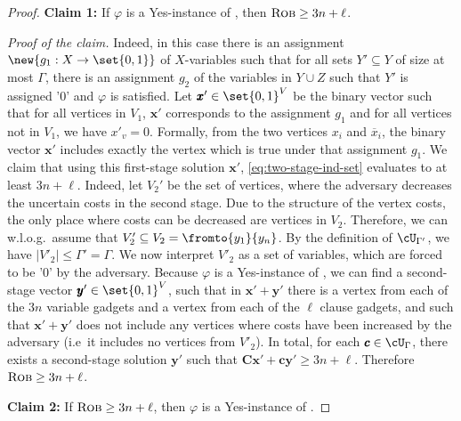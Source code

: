 \documentclass[a4paper,abstracton]{scrartcl}
\begin{document}
\begin{proof}
\textbf{Claim 1:} If $\varphi$ is a Yes-instance of {\radj}, then $\textsc{Rob} \geq 3n + \ell$. 

\emph{Proof of the claim.} Indeed, in this case there is an assignment $\new{g_1 : X \to \set{0,1}}$ of $X$-variables such that for all sets $Y' \subseteq Y$ of size at most $\Gamma$, there is an assignment $g_2$ of the variables in $Y \cup Z$ such that $Y'$ is assigned '$0$' and $\varphi$ is satisfied. 
Let $\pmb x' \in \set{0,1}^V$ be the binary vector such that for all vertices in $V_1$, $\pmb x'$ corresponds to the assignment $g_1$ and for all vertices not in $V_1$, we have $x'_v = 0$. Formally, from the two vertices $x_i$ and $\overline{x}_i$, the binary vector $\pmb x'$ includes exactly the vertex which is true under that assignment $g_1$. 
We claim that using this first-stage solution $\pmb x'$, \cref{eq:two-stage-ind-set} evaluates to at least $3n + \ell$. 
Indeed, let $V_2'$ be the set of vertices, where the adversary decreases the uncertain costs in the second stage. 
Due to the structure of the  vertex costs, the only place where costs can be decreased are vertices in $V_2$. Therefore, we can w.l.o.g.\ assume that $V_2' \subseteq V_2 = \fromto{y_1}{y_n}$. 
By the definition of $\cU_{\Gamma'}$, we have $|V'_2| \leq \Gamma' = \Gamma$. 
We now interpret $V'_2$ as a set of variables, which are forced to be '0' by the adversary.
Because $\varphi$ is a Yes-instance of {\radj}, we can find a second-stage vector $\pmb y' \in \set{0,1}^V$, such that in $\pmb x' + \pmb y'$ there is a vertex from each of the $3n$ variable gadgets and a vertex from each of the $\ell$ clause gadgets, and such that $\pmb x' + \pmb y'$ does not include any vertices where costs have been increased by the adversary (i.e\ it includes no vertices from $V'_2$). 
In total, for each $\pmb c \in \cU_\Gamma$, there exists a second-stage solution $\pmb y'$ such that $\pmb C \pmb x' + \pmb c \pmb y' \geq 3n + \ell$. 
Therefore $\textsc{Rob} \geq 3n + \ell$.

\textbf{Claim 2:} If $\textsc{Rob} \geq 3n + \ell$, then $\varphi$ is a Yes-instance of {\radj}. 


\end{proof}
\end{document}
